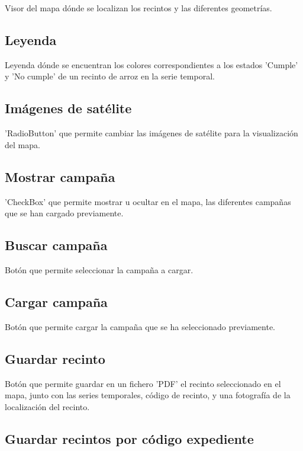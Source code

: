 \documentclass{article}
\begin{document}
Visor del mapa dónde se localizan los recintos y las diferentes geometrías.

\subsection{Leyenda}

Leyenda dónde se encuentran los colores correspondientes a los estados 'Cumple' y 'No cumple' de un recinto de arroz en la serie temporal.

\subsection{Imágenes de satélite}

'RadioButton' que permite cambiar las imágenes de satélite para la visualización del mapa.

\subsection{Mostrar campaña}

'CheckBox' que permite mostrar u ocultar en el mapa, las diferentes campañas que se han cargado previamente.

\subsection{Buscar campaña}

Botón que permite seleccionar la campaña a cargar.

\subsection{Cargar campaña}

Botón que permite cargar la campaña que se ha seleccionado previamente.

\subsection{Guardar recinto}

Botón que permite guardar en un fichero 'PDF' el recinto seleccionado en el mapa, junto con las series temporales, código de recinto, y una fotografía de la localización del recinto.

\subsection{Guardar recintos por código expediente}
\end{document}
